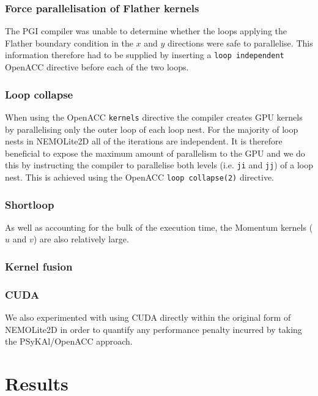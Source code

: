 \documentclass[gmd, manuscript]{copernicus}
\begin{document}
\subsubsection{Force parallelisation of Flather kernels}

The PGI compiler was unable to determine whether the loops applying
the Flather boundary condition in the $x$ and $y$ directions were safe
to parallelise. This information therefore had to be supplied by
inserting a \texttt{loop independent} OpenACC directive before each of
the two loops.

\subsubsection{Loop collapse}

When using the OpenACC \texttt{kernels} directive the compiler creates
GPU kernels by parallelising only the outer loop of each loop nest.
For the majority of loop nests in NEMOLite2D all of the iterations are
independent. It is therefore beneficial to expose the maximum amount
of parallelism to the GPU and we do this by instructing the compiler
to parallelise both levels (i.e. \texttt{ji} and \texttt{jj}) of a
loop nest. This is achieved using the OpenACC \texttt{loop collapse(2)}
directive.

\subsubsection{Shortloop}

As well as accounting for the bulk of the execution time, the Momentum
kernels ($u$ and $v$) are also relatively large.

\subsubsection{Kernel fusion}


\subsubsection{CUDA}

We also experimented with using CUDA directly within the original form
of NEMOLite2D in order to quantify any performance penalty incurred by
taking the {PS}y{KA}l/OpenACC approach.

\section{Results}
\end{document}
